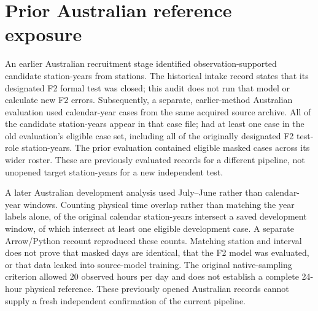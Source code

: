 \section{Prior Australian reference exposure}
An earlier Australian recruitment stage identified \AURefYears{} observation-supported candidate station-years from \AURefStations{} stations. The historical intake record states that its designated F2 formal test was closed; this audit does not run that model or calculate new F2 errors. Subsequently, a separate, earlier-method Australian evaluation used calendar-year cases from the same acquired source archive. All \AUFirstMatch{} of the candidate station-years appear in that case file; \AUFirstEvaluable{} had at least one case in the old evaluation's eligible case set, including all \AUFormerTestEvaluable{} of the \AUFormerTest{} originally designated F2 test-role station-years. The prior evaluation contained \AUFirstCases{} eligible masked cases across its wider roster. These are previously evaluated records for a different pipeline, not unopened target station-years for a new independent test.

A later Australian development analysis used July--June rather than calendar-year windows. Counting physical time overlap rather than matching the year labels alone, \AUHotOverlap{} of the original \AURefYears{} calendar station-years intersect a saved development window, of which \AUHotEvaluable{} intersect at least one eligible development case. A separate Arrow/Python recount reproduced these counts. Matching station and interval does not prove that masked days are identical, that the F2 model was evaluated, or that data leaked into source-model training. The original native-sampling criterion allowed 20 observed hours per day and does not establish a complete 24-hour physical reference. These previously opened Australian records cannot supply a fresh independent confirmation of the current pipeline.
